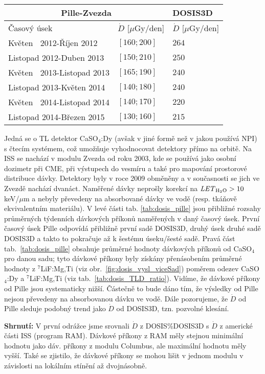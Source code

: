 \begin{itemize}
\begin{table}[ht]
	  \begin{tabular}{l|l||l}
		\toprule
		\multicolumn{2}{c||}{Pille-Zvezda}&DOSIS3D\\
		\midrule
		Časový úsek&$\dot{D}$ [$\mu$Gy/den]&$\dot{D}$ [$\mu$Gy/den]\\
		\midrule
		Květen $\ $ 2012-Říjen 2012&$[160;200]$&$264$	\\
		Listopad 2012-Duben  2013&$[150;210]$&$250$	\\
		Květen $\ $ 2013-Listopad 2013&$[165;190]$&$240$	\\
		Listopad 2013-Květen  2014&$[140;180]$&$240$	\\
		Květen $\ $ 2014-Listopad 2014&$[140;170]$&$220$	\\
		Listopad 2014-Březen  2015&$[130;160]$&$215$	\\
		\bottomrule
	  \end{tabular}
	\end{table}
	 Jedná se o TL detektor CaSO$_4$:Dy (avšak v jiné formě než v jakou používá NPI) s čtecím systémem, což umožňuje vyhodnocovat detektory přímo na orbitě. Na ISS se nachází v modulu Zvezda od roku 2003, kde se používá jako osobní dozimetr při CME, při výstupech do vesmíru a také pro mapování prostorové distribuce dávky. Detektory byly v roce 2009 obměněny a v současnosti se jich ve Zvezdě nachází dvanáct. Naměřené dávky neprošly korekcí na $\mathit{LET}_{\text{H$_2$O}}>10$ keV/$\mu$m a nebyly převedeny na absorbované dávky ve vodě (resp. tkáňově ekvivalentním materiálu). V levé části tab. \ref{tab:dosis_pille} jsou
	 přibližné rozsahy průměrných týdenních dávkových příkonů naměřených v daný časový úsek.	První časový úsek Pille odpovídá přibližně první sadě DOSIS3D, druhý úsek druhé sadě DOSIS3D a takto to pokračuje až k šestému úseku/šesté sadě. Pravá část tab.~\ref{tab:dosis_pille} obsahuje průměrné hodnoty dávkových příkonů od CaSO$_4$ pro danou sadu; tyto dávkové příkony byly získány přenásobením průměrné hodnoty z $^7$LiF:Mg,Ti (viz obr.~\ref{fig:dosis_vysl_viceSad}) poměrem odezev CaSO$_4$:Dy a $^7$LiF:Mg,Ti (viz tab.~\ref{tab:dosis_TLD_ratio}). Vidíme, že dávkové příkony od Pille jsou systematicky nižší. Částečně to bude dáno tím, že výsledky od Pille nejsou převedeny na absorbovanou dávku ve vodě. Dále pozorujeme, že $\dot{D}$ od Pille sleduje podobný trend jako
	 $\dot{D}$ od DOSIS3D, tzn. pozvolné klesání.~\cite{pille, pille2}
 \end{itemize}
 \textbf{Shrnutí:} V první odrážce jsme srovnali $\dot{D}$ z DOSIS\%DOSIS3D s $\dot{D}$ z americké části ISS (program RAM). Dávkové příkony z RAM měly stejnou minimální hodnotu jako dáv. příkony z modulu Columbus, ale maximální hodnotu měly vyšší. Také se zjistilo, že dávkové příkony se mohou lišit v jednom modulu v závislosti na lokálním stínění až dvojnásobně.
 
